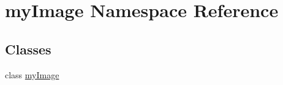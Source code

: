\hypertarget{namespacemy_image}{\section{my\-Image Namespace Reference}
\label{namespacemy_image}
}
\subsection*{Classes}
\begin{DoxyCompactItemize}
\item 
class \hyperlink{classmy_image_1_1my_image}{my\-Image}
\end{DoxyCompactItemize}
